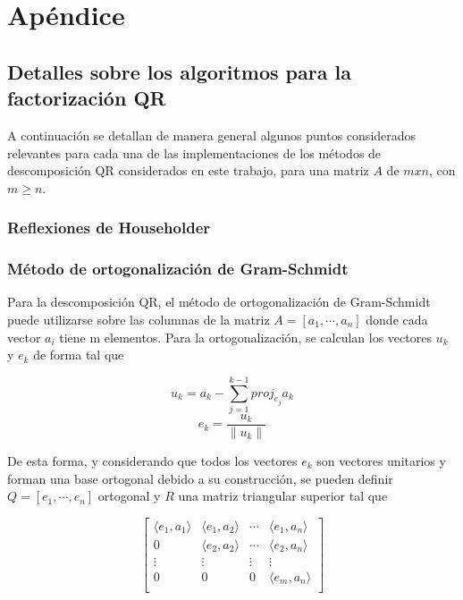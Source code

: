 \documentclass[journal, monochrome]{IEEEtran}
\begin{document}

\clearpage
\section{Apéndice}
\vspace{0.5cm}
\subsection{Detalles sobre los algoritmos para la factorización QR}
\par
A continuación se detallan de manera general algunos puntos considerados relevantes para cada una de las implementaciones de los métodos de descomposición QR considerados en este trabajo, para una matriz $A$ de $mxn$, con $m \geq n$.
\newline
\subsubsection{Reflexiones de Householder}
\par
\subsubsection{Método de ortogonalización de Gram-Schmidt}
\par
Para la descomposición QR, el método de ortogonalización de Gram-Schmidt puede utilizarse sobre las columnas de la matriz $ A = [ a_1, \cdots , a_n ] $ donde cada vector $a_{i}$ tiene m elementos. Para la ortogonalización, se calculan los vectores $u_k$ y $e_k$ de forma tal que

\begin{equation}
u_{k} = a_{k} - \sum_{j=1}^{k-1} proj_{e_{j}}a_{k}
\end{equation}
\begin{equation}
e_{k} = \frac{u_k}{\parallel u_k \parallel}
\end{equation}

De esta forma, y considerando que todos los vectores $e_k$ son vectores unitarios y forman una base ortogonal debido a su construcción, se pueden definir $ Q = [ e_1, \cdots , e_n ] $ ortogonal y $R$ una matriz triangular superior tal que

\begin{equation}
\left[
\begin{array}{cccc}
\langle e_1, a_1 \rangle & \langle e_1, a_2 \rangle & \cdots & \langle e_1, a_n \rangle \\
0 & \langle e_2, a_2 \rangle & \cdots & \langle e_2, a_n \rangle \\
\vdots & \vdots & \vdots & \vdots \\
0 & 0 & 0 & \langle e_m, a_n \rangle \\
\end{array}
\right]
\end{equation}
\end{document}
